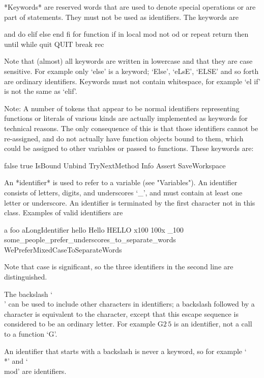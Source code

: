 {*Keywords* are reserved words that are used to denote special operations
or are part of statements. They must not be used as identifiers. The
keywords are

\begintt
and     do       elif   else    end     fi
for     function if     in      local   mod
not     od       or     repeat  return  then
until   while    quit   QUIT    break   rec 
\endtt

Note that (almost) all keywords are written in lowercase and that they
are case sensitive. For example only `else' is a keyword; `Else',
`eLsE', `ELSE' and so forth are ordinary identifiers. Keywords must
not contain whitespace, for example `el if' is not the same as `elif'.

Note: A number of tokens that appear to be normal identifiers
representing functions or literals of various kinds are actually
implemented as keywords for technical reasons. The only consequence of
this is that those identifiers cannot be re-assigned, and do not
actually have function objects bound to them, which could be assigned
to other variables or passed to functions. These keywords are:

\begintt
false 	true	IsBound	Unbind	TryNextMethod	
Info	Assert	SaveWorkspace
\endtt



An *identifier* is used to refer to  a variable (see "Variables").  An
identifier consists of letters, digits, and underscores `\_', and must
contain at least one letter or underscore.  An identifier is terminated
by the first character not in this class. Examples of valid identifiers
are

\begintt
a           foo         aLongIdentifier
hello       Hello       HELLO
x100        100x       _100
some_people_prefer_underscores_to_separate_words
WePreferMixedCaseToSeparateWords
\endtt

Note that case is significant, so the three identifiers in the second
line are distinguished.

The backslash `\\' can be used to include other characters in identifiers;
a backslash followed by a character is equivalent  to the character,
except that this escape sequence is considered to be an ordinary letter.
For example
\begintt
G\(2\,5\)
\endtt
is an identifier, not a call to a function `G'.

An identifier that starts with a backslash is never a keyword, so for
example `\\*' and `\\mod' are identifiers.

}
